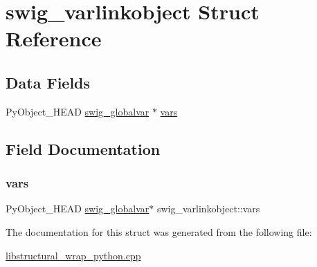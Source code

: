 \hypertarget{structswig__varlinkobject}{}\section{swig\+\_\+varlinkobject Struct Reference}
\label{structswig__varlinkobject}
\subsection*{Data Fields}
\begin{DoxyCompactItemize}
\item 
Py\+Object\+\_\+\+H\+E\+AD \hyperlink{structswig__globalvar}{swig\+\_\+globalvar} $\ast$ \hyperlink{structswig__varlinkobject_a8cf96d999cdf0b28a0e90ccb6804c9bd}{vars}
\end{DoxyCompactItemize}


\subsection{Field Documentation}
\mbox{\label{structswig__varlinkobject_a8cf96d999cdf0b28a0e90ccb6804c9bd}} 
\subsubsection{\texorpdfstring{vars}{vars}}
{\footnotesize\ttfamily Py\+Object\+\_\+\+H\+E\+AD \hyperlink{structswig__globalvar}{swig\+\_\+globalvar}$\ast$ swig\+\_\+varlinkobject\+::vars}



The documentation for this struct was generated from the following file\+:\begin{DoxyCompactItemize}
\item 
\hyperlink{libstructural__wrap__python_8cpp}{libstructural\+\_\+wrap\+\_\+python.\+cpp}\end{DoxyCompactItemize}
